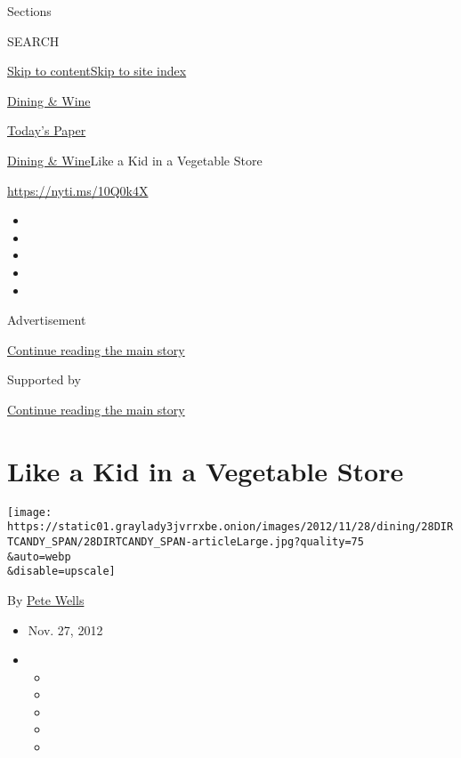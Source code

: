 Sections

SEARCH

\protect\hyperlink{site-content}{Skip to
content}\protect\hyperlink{site-index}{Skip to site index}

\href{https://www.nytimes3xbfgragh.onion/pages/dining/index.html}{Dining
\& Wine}

\href{https://myaccount.nytimes3xbfgragh.onion/auth/login?response_type=cookie\&client_id=vi}{}

\href{https://www.nytimes3xbfgragh.onion/section/todayspaper}{Today's
Paper}

\href{/pages/dining/index.html}{Dining \& Wine}\textbar{}Like a Kid in a
Vegetable Store

\url{https://nyti.ms/10Q0k4X}

\begin{itemize}
\item
\item
\item
\item
\item
\end{itemize}

Advertisement

\protect\hyperlink{after-top}{Continue reading the main story}

Supported by

\protect\hyperlink{after-sponsor}{Continue reading the main story}

\hypertarget{like-a-kid-in-a-vegetable-store}{%
\section{Like a Kid in a Vegetable
Store}\label{like-a-kid-in-a-vegetable-store}}

\texttt{[image: https://static01.graylady3jvrrxbe.onion/images/2012/11/28/dining/28DIRTCANDY\_SPAN/28DIRTCANDY\_SPAN-articleLarge.jpg?quality=75\\\&auto=webp\\\&disable=upscale]}

By \href{https://www.nytimes3xbfgragh.onion/by/pete-wells}{Pete Wells}

\begin{itemize}
\item
  Nov. 27, 2012
\item
  \begin{itemize}
  \item
  \item
  \item
  \item
  \item
  \end{itemize}
\end{itemize}

